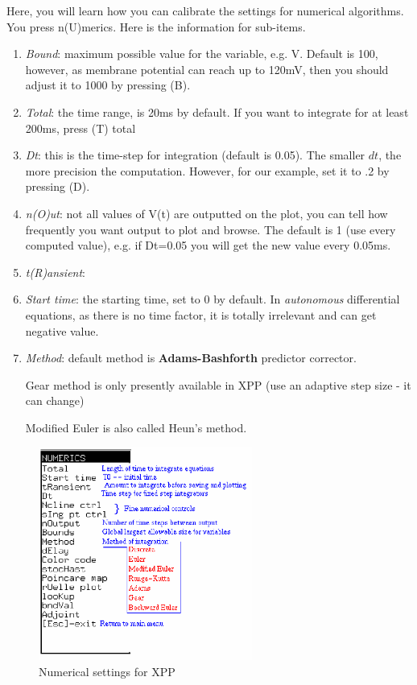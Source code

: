 Here, you will learn how you can calibrate the settings for  numerical
algorithms. You press n(U)merics. Here is the information for
sub-items. 

\begin{enumerate}
\item {\it Bound}: maximum possible value for the variable,
  e.g. V. Default is 100, however, as membrane potential can reach up
  to 120mV, then you should adjust it to 1000 by pressing (B).

\item {\it Total}: the time range, is 20ms by default. If you want to
  integrate for at least 200ms, press (T) total

\item {\it Dt}: this is the time-step for integration (default is
  0.05). The smaller $dt$, the more precision the
  computation. However, for our example, set it to .2 by pressing (D).

\item {\it n(O)ut}: not all values of V(t) are outputted on the plot,
  you can tell how frequently you want output to plot and browse. The
  default is 1 (use every computed value), e.g. if Dt=0.05 you will
  get the new value every 0.05ms.

\item {\it t(R)ansient}: 

\item {\it Start time}: the starting time, set to 0 by default. In
  {\it autonomous} differential equations, as there is no time factor, it is
  totally irrelevant and can get negative value. 

\item {\it Method}: default method is {\bf Adams-Bashforth} predictor
  corrector.

Gear method is only presently available in XPP (use an adaptive step
size - it can change)

Modified Euler is also called Heun's method.
\end{enumerate}

\begin{figure}[htb]
  \centerline{\includegraphics[height=7cm]{./images/XPP_numcom.eps}}
  \caption{Numerical settings for XPP}\label{fig:XPP_numcom}
\end{figure}

